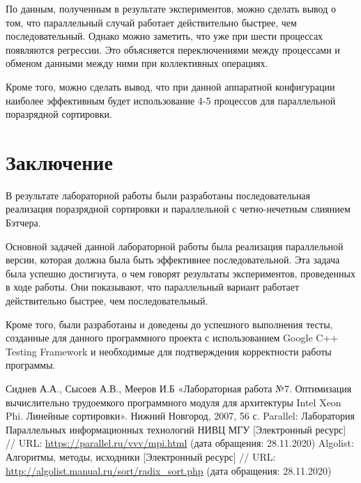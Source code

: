 \documentclass{report}
\begin{document}
\par По данным, полученным в результате экспериментов, можно сделать вывод о том, что параллельный случай работает действительно быстрее, чем последовательный. Однако можно заметить, что уже при шести процессах появляются регрессии. Это объясняется переключениями между процессами и обменом данными между ними при коллективных операциях.
\par Кроме того, можно сделать вывод, что при данной аппаратной конфигурации наиболее эффективным будет использование 4-5 процессов для параллельной поразрядной сортировки.
\newpage

\section*{Заключение}
В результате лабораторной работы были разработаны последовательная реализация поразрядной сортировки и параллельной с четно-нечетным слиянием Бэтчера.
\par Основной задачей данной лабораторной работы была реализация параллельной версии, которая должна была быть эффективнее последовательной. Эта задача была успешно достигнута, о чем говорят результаты экспериментов, проведенных в ходе работы. Они показывают, что параллельный вариант работает действительно быстрее, чем последовательный.
\par Кроме того, были разработаны и доведены до успешного выполнения тесты, созданные для данного программного проекта с использованием Google C++ Testing Framework и необходимые для подтверждения корректности работы программы.
\newpage

\begin{thebibliography}{1}
 Сиднев А.А., Сысоев А.В., Мееров И.Б «Лабораторная работа №7. Оптимизация вычислительно трудоемкого программного модуля для архитектуры Intel Xeon Phi. Линейные сортировки». Нижний Новгород, 2007, 56 с. 
 Parallel: Лаборатория Параллельных информационных технологий НИВЦ МГУ [Электронный ресурс] // URL: \url {https://parallel.ru/vvv/mpi.html} (дата обращения: 28.11.2020)
 Algolist: Алгоритмы, методы, исходники [Электронный ресурс] // URL: \url {http://algolist.manual.ru/sort/radix_sort.php} (дата обращения: 28.11.2020)
\end{thebibliography}
\newpage

\end{document}
